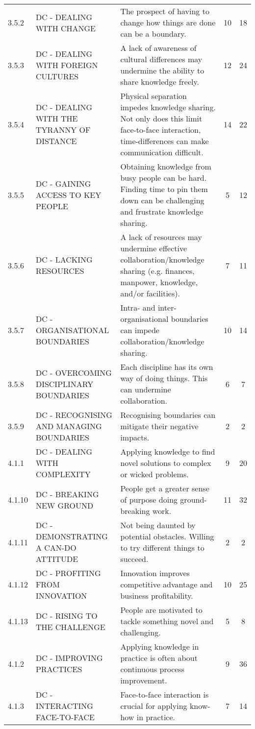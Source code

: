 \begin{landscape}
\begin{longtable}[c]{@{}ll p{6cm}cc@{}}
3.5.2 & DC - DEALING WITH CHANGE & The prospect of having to change how things are done can be a boundary. & 10 & 18 \\
3.5.3 & DC - DEALING WITH FOREIGN CULTURES & A lack of awareness of cultural differences may undermine the ability to share knowledge freely. & 12 & 24 \\
3.5.4 & DC - DEALING WITH THE TYRANNY OF DISTANCE & Physical separation impedes knowledge sharing. Not only does this limit face-to-face interaction, time-differences can make communication difficult. & 14 & 22 \\
3.5.5 & DC - GAINING ACCESS TO KEY PEOPLE & Obtaining knowledge from busy people can be hard. Finding time to pin them down can be challenging and frustrate knowledge sharing. & 5 & 12 \\
3.5.6 & DC - LACKING RESOURCES & A lack of resources may undermine effective collaboration/knowledge sharing (e.g. finances, manpower, knowledge, and/or facilities). & 7 & 11 \\
3.5.7 & DC - ORGANISATIONAL BOUNDARIES & Intra- and inter-organisational boundaries can impede collaboration/knowledge sharing. & 10 & 14 \\
3.5.8 & DC - OVERCOMING DISCIPLINARY BOUNDARIES & Each discipline has its own way of doing things. This can undermine collaboration. & 6 & 7 \\
3.5.9 & DC - RECOGNISING AND MANAGING BOUNDARIES & Recognising boundaries can mitigate their negative impacts. & 2 & 2 \\
4.1.1 & DC - DEALING WITH COMPLEXITY & Applying knowledge to find novel solutions to complex or wicked problems. & 9 & 20 \\
4.1.10 & DC - BREAKING NEW GROUND & People get a greater sense of purpose doing ground-breaking work. & 11 & 32 \\
4.1.11 & DC - DEMONSTRATING A CAN-DO ATTITUDE & Not being daunted by potential obstacles. Willing to try different things to succeed. & 2 & 2 \\
4.1.12 & DC - PROFITING FROM INNOVATION & Innovation improves competitive advantage and business profitability. & 10 & 25 \\
4.1.13 & DC - RISING TO THE  CHALLENGE & People are motivated to tackle something novel and challenging. & 5 & 8 \\
4.1.2 & DC - IMPROVING PRACTICES & Applying knowledge in practice is often about continuous process improvement. & 9 & 36 \\
4.1.3 & DC - INTERACTING FACE-TO-FACE & Face-to-face interaction is crucial for applying know-how in practice. & 7 & 14 \\

\end{longtable}
\end{landscape}
